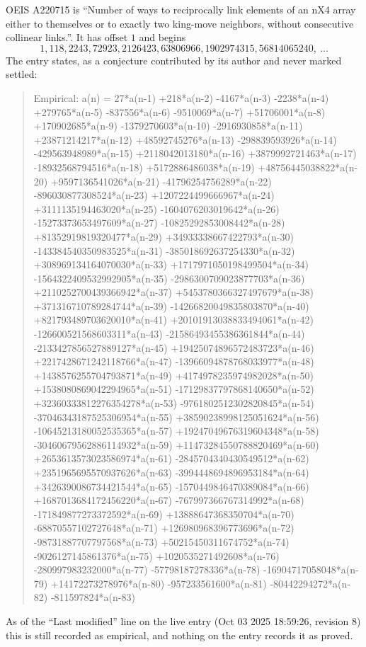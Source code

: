 \documentclass[11pt,a4paper]{article}
\theoremstyle{plain}
\theoremstyle{definition}
\begin{document}
OEIS A220715 is ``Number of ways to reciprocally link elements of an nX4 array either to themselves or to exactly two king-move neighbors, without consecutive collinear links.''. It has offset $1$ and begins
\[
1, 118, 2243, 72923, 2126423, 63806966, 1902974315, 56814065240,\ \dots
\]
The entry states, as a conjecture contributed by its author and never marked settled:
\begin{quote}
Empirical: a(n) = 27*a(n-1) +218*a(n-2) -4167*a(n-3) -2238*a(n-4) +279765*a(n-5) -837556*a(n-6) -9510069*a(n-7) +51706001*a(n-8) +170902685*a(n-9) -1379270603*a(n-10) -2916930858*a(n-11) +23871214217*a(n-12) +48592745276*a(n-13) -298839593926*a(n-14) -429563948989*a(n-15) +2118042013180*a(n-16) +3879992721463*a(n-17) -18932568794516*a(n-18) +5172886486038*a(n-19) +48756445038822*a(n-20) +9597136541026*a(n-21) -41796254756289*a(n-22) -896030877308524*a(n-23) +1207224499666967*a(n-24) +3111135194463020*a(n-25) -1604076203019642*a(n-26) -15273373653497609*a(n-27) -10825292853008442*a(n-28) +81352919819320477*a(n-29) +34933338667422793*a(n-30) -143384540350983525*a(n-31) -385018692637254330*a(n-32) +308969134164070030*a(n-33) +1717971050198499504*a(n-34) -1564322409532992905*a(n-35) -2986300709023877703*a(n-36) +2110252700439366942*a(n-37) +5453780366327497679*a(n-38) +371316710789284744*a(n-39) -14266820049835803870*a(n-40) +821793489703620010*a(n-41) +20101913038833494061*a(n-42) -126600521568603311*a(n-43) -21586493455386361844*a(n-44) -2133427856527889127*a(n-45) +19425074896572483723*a(n-46) +2217428671242118766*a(n-47) -13966094878768033977*a(n-48) +1438576255704793871*a(n-49) +4174978235974982028*a(n-50) +1538080869042294965*a(n-51) -17129837797868140650*a(n-52) +32360333812276354278*a(n-53) -9761802512302820845*a(n-54) -37046343187525306954*a(n-55) +38590238998125051624*a(n-56) -10645213180052535365*a(n-57) +19247049676319604348*a(n-58) -30460679562886114932*a(n-59) +11473284550788820469*a(n-60) +2653613573023586974*a(n-61) -2845704340430549512*a(n-62) +2351965695570937626*a(n-63) -3994448694896953184*a(n-64) +3426390086734421544*a(n-65) -1570449846470389084*a(n-66) +1687013684172456220*a(n-67) -767997366767314992*a(n-68) -171849877273372592*a(n-69) +13888647368350704*a(n-70) -68870557102727648*a(n-71) +126980968396773696*a(n-72) -98731887707797568*a(n-73) +50215450311674752*a(n-74) -9026127145861376*a(n-75) +1020535271492608*a(n-76) -280997983232000*a(n-77) -57798187278336*a(n-78) -16904717058048*a(n-79) +14172273278976*a(n-80) -957233561600*a(n-81) -80442294272*a(n-82) -811597824*a(n-83)
\end{quote}
As of the ``Last modified'' line on the live entry (Oct 03 2025 18:59:26, revision 8) this is still
recorded as empirical, and nothing on the entry records it as proved.
\end{document}
